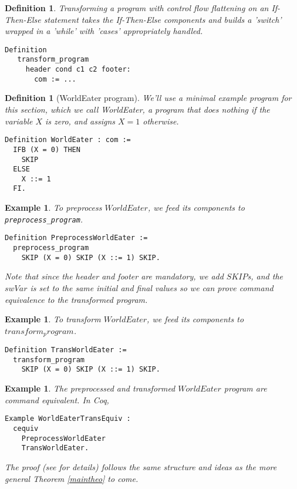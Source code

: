 \documentclass[compsoc,conference,a4paper,10pt,times]{IEEEtran}
\newtheorem{defin}[theorem]{Definition}
\newtheorem{example}[theorem]{Example}
\begin{document}
\begin{defin}
Transforming a program with control flow flattening on an If-Then-Else statement takes the If-Then-Else components and builds a 'switch' wrapped in a 'while' with 'cases' appropriately handled.
\begin{verbatim}
Definition 
   transform_program 
     header cond c1 c2 footer: 
       com := ...
\end{verbatim}
\end{defin}

\begin{defin}[WorldEater program]
We'll use a minimal example program for this section, which we call \emph{WorldEater}, a program that does nothing if the variable $X$ is zero, and assigns $X=1$ otherwise.

\begin{verbatim}
Definition WorldEater : com :=
  IFB (X = 0) THEN
    SKIP
  ELSE
    X ::= 1
  FI.
\end{verbatim}
\end{defin}

\begin{example}
To preprocess $WorldEater$, we feed its components to \verb$preprocess_program$.
\begin{verbatim}
Definition PreprocessWorldEater := 
  preprocess_program 
    SKIP (X = 0) SKIP (X ::= 1) SKIP.
\end{verbatim}

Note that since the header and footer are mandatory, we add $SKIP$s, and the $swVar$ is set to the same initial and final values so we can prove command equivalence to the transformed program.
\end{example}

\begin{example}
To transform $WorldEater$, we feed its components to $transform_program$.
\begin{verbatim}
Definition TransWorldEater := 
  transform_program 
    SKIP (X = 0) SKIP (X ::= 1) SKIP.
\end{verbatim}
\end{example}

\begin{example}\label{WE_example}
The preprocessed and transformed $WorldEater$ program are command equivalent.  In Coq,
\begin{verbatim}
Example WorldEaterTransEquiv : 
  cequiv 
    PreprocessWorldEater 
    TransWorldEater.
\end{verbatim}
The proof (see \cite{Weyun} for details) follows the same structure and ideas as the more general Theorem \ref{maintheo} to come.
\end{example}
\end{document}
